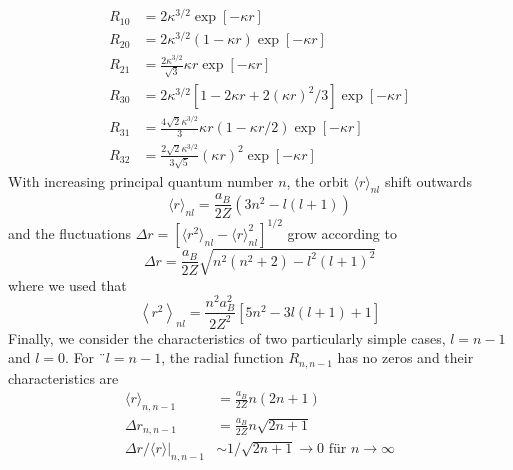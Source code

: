 \begin{equation}
\begin{aligned} R_{10} &=2 \kappa^{3 / 2} \exp [-\kappa r] \\ R_{20} &=2 \kappa^{3 / 2}(1-\kappa r) \exp [-\kappa r] \\ R_{21} &=\frac{2 \kappa^{3 / 2}}{\sqrt{3}} \kappa r \exp [-\kappa r] \\ R_{30} &=2 \kappa^{3 / 2}\left[1-2 \kappa r+2(\kappa r)^{2} / 3\right] \exp [-\kappa r] \\ R_{31} &=\frac{4 \sqrt{2} \kappa^{3 / 2}}{3} \kappa r(1-\kappa r / 2) \exp [-\kappa r] \\ R_{32} &=\frac{2 \sqrt{2} \kappa^{3 / 2}}{3 \sqrt{5}}(\kappa r)^{2} \exp [-\kappa r] \end{aligned}
\end{equation}
With increasing principal quantum number $n$, the orbit $\langle r\rangle_{nl}$ shift outwards
\begin{equation}
    \langle r\rangle_{n l}=\frac{a_{B}}{2 Z}\left(3 n^{2}-l(l+1)\right)
    \end{equation}
and the fluctuations $\Delta r=[\langle r^2\rangle_{nl}-\langle r\rangle^2_{nl}]^{1/2}$ grow according to
\begin{equation}
    \Delta r=\frac{a_{B}}{2 Z} \sqrt{n^{2}\left(n^{2}+2\right)-l^{2}(l+1)^{2}}
    \end{equation}
where we used that
\begin{equation}
    \left\langle r^{2}\right\rangle_{n l}=\frac{n^{2} a_{B}^{2}}{2 Z^{2}}\left[5 n^{2}-3 l(l+1)+1\right]
    \end{equation}
Finally, we consider the characteristics of two particularly simple cases, $l = n - 1$ and $l = 0$. For $¨l = n - 1$, the radial function $R_{n, n-1}$ has no zeros and their characteristics are
\begin{equation}
\begin{aligned}\langle r\rangle_{n, n-1} &=\frac{a_{B}}{2 Z} n(2 n+1) \\ \Delta r_{n, n-1} &=\frac{a_{B}}{2 Z} n \sqrt{2 n+1} \\ \Delta r /\left.\langle r\rangle\right|_{n, n-1} & \sim 1 / \sqrt{2 n+1} \rightarrow 0 \text { für } n \rightarrow \infty \end{aligned}
\end{equation}
